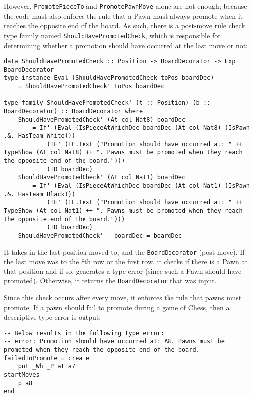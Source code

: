 \documentclass[12pt, a4paper, bibliography=totocnumbered]{scrreprt}
\newcommand{\inline}[1]{\lstinline[basicstyle=\ttfamily\footnotesize]{#1}}
\begin{document}
However, \inline{PromotePieceTo} and \inline{PromotePawnMove} alone are not enough; because the code must also enforce the rule that a Pawn must always promote when it reaches the opposite end of the board. As such, there is a post-move rule check type family named \inline{ShouldHavePromotedCheck}, which is responsible for determining whether a promotion should have occurred at the last move or not:

\begin{lstlisting}
data ShouldHavePromotedCheck :: Position -> BoardDecorator -> Exp BoardDecorator
type instance Eval (ShouldHavePromotedCheck toPos boardDec)
    = ShouldHavePromotedCheck' toPos boardDec

type family ShouldHavePromotedCheck' (t :: Position) (b :: BoardDecorator) :: BoardDecorator where
    ShouldHavePromotedCheck' (At col Nat8) boardDec
        = If' (Eval (IsPieceAtWhichDec boardDec (At col Nat8) (IsPawn .&. HasTeam White)))
            (TE' (TL.Text ("Promotion should have occurred at: " ++ TypeShow (At col Nat8) ++ ". Pawns must be promoted when they reach the opposite end of the board.")))
            (ID boardDec)
    ShouldHavePromotedCheck' (At col Nat1) boardDec
        = If' (Eval (IsPieceAtWhichDec boardDec (At col Nat1) (IsPawn .&. HasTeam Black)))
            (TE' (TL.Text ("Promotion should have occurred at: " ++ TypeShow (At col Nat1) ++ ". Pawns must be promoted when they reach the opposite end of the board.")))
            (ID boardDec)
    ShouldHavePromotedCheck' _ boardDec = boardDec
\end{lstlisting}

It takes in the last position moved to, and the \inline{BoardDecorator} (post-move).  If the last move was to the 8th row or the first row, it checks if there is a Pawn at that position and if so, generates a type error (since such a Pawn should have promoted). Otherwise, it returns the \inline{BoardDecorator} that was input.

Since this check occurs after every move, it enforces the rule that pawns must promote. If a pawn should fail to promote during a game of Chess, then a descriptive type error is output:

\begin{lstlisting}
-- Below results in the following type error:
-- error: Promotion should have occurred at: A8. Pawns must be promoted when they reach the opposite end of the board.
failedToPromote = create
    put _Wh _P at a7
startMoves
    p a8
end
\end{lstlisting}
\end{document}
